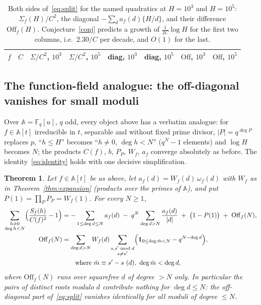 \documentclass[11pt,a4paper]{article}
\newtheorem{theorem}{Theorem}
\theoremstyle{remark}\newtheorem{remark}[theorem]{Remark}
\newcommand{\F}{\mathbb{F}}
\newcommand{\A}{\mathbb{A}}
\begin{document}
\begin{table}[htbp]
\centering\small
\caption{Both sides of~\eqref{eq:split} for the named quadratics at $H=10^3$ and $H=10^5$:
$\Sigma_f(H)/C^2$, the diagonal $-\sum_da_f(d)\{H/d\}$, and their difference $\mathrm{Off}_f(H)$.
Conjecture~\ref{conj} predicts a growth of $\frac1{2C}\log H$ for the first two columns, i.e.\
$2.30/C$ per decade, and $O(1)$ for the last.}\label{tab:off}
\begin{tabular}{lrrrrrrr}
\toprule
$f$ & $C$ & $\Sigma/C^2$, $10^3$ & $\Sigma/C^2$, $10^5$ & diag, $10^3$ & diag, $10^5$ & $\mathrm{Off}$, $10^3$ & $\mathrm{Off}$, $10^5$\\
\midrule

\end{tabular}
\end{table}

\subsection{The function-field analogue: the off-diagonal vanishes for small moduli}\label{sec:ff}

Over $\A=\F_q[u]$, $q$ odd, every object above has a verbatim analogue: for $f\in\A[t]$ irreducible in
$t$, separable and without fixed prime divisor, $|P|=q^{\deg P}$ replaces $p$, ``$h\le H$'' becomes
``$h\ne0$, $\deg h<N$'' ($q^N-1$ elements) and $\log H$ becomes $N$; the products $C(f)$, $b$, $P_P$,
$W_f$, $a_f$ converge absolutely as before. The identity~\eqref{eq:identity} holds with one decisive
simplification.

\begin{theorem}\label{thm:ff}
Let $f\in\A[t]$ be as above, let $a_f(d)=W_f(d)\,\omega_f(d)$ with $W_f$ as in Theorem~\ref{thm:expansion}
(products over the primes of $\A$), and put $P(1)=\prod_PP_P=W_f(1)$. For every $N\ge1$,
\begin{align*}
\sum_{\substack{h\ne0\\\deg h<N}}\Bigl(\frac{S_f(h)}{C(f)^2}-1\Bigr)
&=-\sum_{1\le\deg d\le N}a_f(d)\;-\;q^N\sum_{\deg d>N}\frac{a_f(d)}{|d|}\;+\;\bigl(1-P(1)\bigr)\;+\;\mathrm{Off}_f(N),\\
\mathrm{Off}_f(N)&=\sum_{\deg d>N}W_f(d)\sum_{\substack{s,s'\bmod d\\ s\ne s'}}\Bigl(\mathbf 1_{0\le\deg\tilde m<N}-q^{N-\deg d}\Bigr),\\
&\qquad\text{where }\tilde m\equiv s'-s\ (d),\ \deg\tilde m<\deg d,
\end{align*}
where $\mathrm{Off}_f(N)$
runs over squarefree $d$ of degree $>N$ only. In particular the pairs of \emph{distinct} roots modulo $d$
contribute nothing for $\deg d\le N$: the off-diagonal part of~\eqref{eq:split} vanishes identically for
all moduli of degree $\le N$.
\end{theorem}
\end{document}
